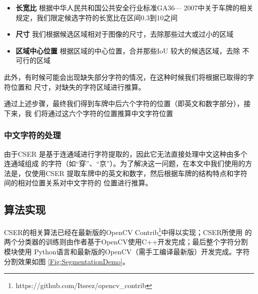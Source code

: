 \begin{itemize}
\item \textbf{长宽比} 根据中华人民共和国公共安全行业标准GA36— 2007中关于车牌的相关
  规定，我们限定候选字符的长宽比在区间0.3到10之间
\item \textbf{尺寸} 我们根据候选区域相对于图像的尺寸，去除那些过大或过小的区域
\item \textbf{区域中心位置} 根据区域的中心位置，合并那些IoU 较大的候选区域，去除
  不可行的区域
\end{itemize} 

此外，有时候可能会出现缺失部分字符的情况，在这种时候我们将根据已取得的字符位置和
尺寸，对缺失的字符区域进行推算。

通过上述步骤，最终我们得到车牌中后六个字符的位置（即英文和数字部分），接下来，我
们将通过这六个字符的位置推算中文字符位置

\subsubsection{中文字符的处理}

由于CSER 是基于连通域进行字符提取的，因此它无法直接处理中文这种由多个连通域组成
的字符（如“穿”、“京”）。为了解决这一问题，在本文中我们使用的方法是，仅使用CSER
提取车牌中的英文和数字，然后根据车牌的结构特点和字符间的相对位置关系对中文字符的
位置进行推算。

\subsection{算法实现}

CSER的相关算法已经在最新版的OpenCV
Contrib\footnote{https://github.com/Itseez/opencv\_contrib}中得以实现；CSER所使用
的两个分类器的训练则由作者基于OpenCV使用C++开发完成；最后整个字符分割模块使用
Python语言和最新版的OpenCV（需手工编译最新版）开发完成。字符分割效果如图
\ref{Fig:SegmentationDemo}。

